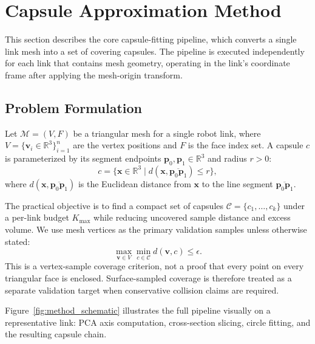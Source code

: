 \section{Capsule Approximation Method}
\label{sec:method}

This section describes the core capsule-fitting pipeline, which converts a single link mesh into a set of covering capsules.
The pipeline is executed independently for each link that contains mesh geometry, operating in the link's coordinate frame after applying the mesh-origin transform.

\subsection{Problem Formulation}

Let $\mathcal{M} = (V, F)$ be a triangular mesh for a single robot link, where $V = \{\mathbf{v}_i \in \mathbb{R}^3\}_{i=1}^{n}$ are the vertex positions and $F$ is the face index set.
A capsule $c$ is parameterized by its segment endpoints $\mathbf{p}_0, \mathbf{p}_1 \in \mathbb{R}^3$ and radius $r > 0$:
\begin{equation}
c = \{ \mathbf{x} \in \mathbb{R}^3 \mid d(\mathbf{x}, \overline{\mathbf{p}_0\mathbf{p}_1}) \leq r \},
\end{equation}
where $d(\mathbf{x}, \overline{\mathbf{p}_0\mathbf{p}_1})$ is the Euclidean distance from $\mathbf{x}$ to the line segment $\overline{\mathbf{p}_0\mathbf{p}_1}$.

The practical objective is to find a compact set of capsules $\mathcal{C} = \{c_1, \dots, c_k\}$ under a per-link budget $K_{\max}$ while reducing uncovered sample distance and excess volume. We use mesh vertices as the primary validation samples unless otherwise stated:
\begin{equation}
\max_{\mathbf{v} \in V} \min_{c \in \mathcal{C}} d(\mathbf{v}, c) \leq \epsilon .
\label{eq:vertex_coverage}
\end{equation}
This is a vertex-sample coverage criterion, not a proof that every point on every triangular face is enclosed. Surface-sampled coverage is therefore treated as a separate validation target when conservative collision claims are required.

Figure~\ref{fig:method_schematic} illustrates the full pipeline visually on a representative link: PCA axis computation, cross-section slicing, circle fitting, and the resulting capsule chain.

